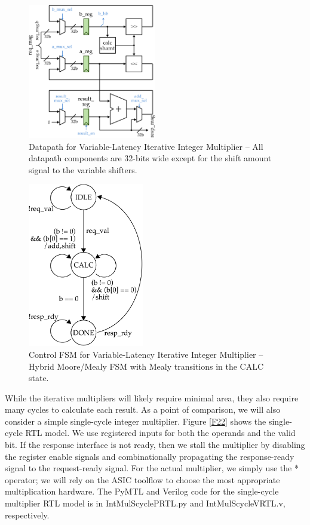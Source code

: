 \documentclass[a4paper,12pt,twoside]{article}
\begin{document}
\begin{figure}[H]
    \centering
    \includegraphics[width=0.5\textwidth]{images/20.png}
    \caption{Datapath for Variable-Latency Iterative Integer Multiplier – All datapath components are 32-bits wide except for the shift amount signal to the variable shifters.}
    \label{F20}
\end{figure}
\begin{figure}[H]
    \centering
    \includegraphics[width=0.45\textwidth]{images/21.png}
    \caption{Control FSM for Variable-Latency Iterative Integer Multiplier – Hybrid Moore/Mealy FSM with Mealy transitions in the CALC state.}
    \label{F21}
\end{figure}
While the iterative multipliers will likely require minimal area, they also require many cycles to calculate each result. As a point of comparison, we will also consider a simple single-cycle integer multiplier. Figure \ref{F22} shows the single-cycle RTL model. We use registered inputs for both the operands and the valid bit. If the response interface is not ready, then we stall the multiplier by disabling the register enable signals and combinationally propagating the response-ready signal to the request-ready signal. For the actual multiplier, we simply use the * operator; we will rely on the ASIC toolflow to choose the most appropriate multiplication hardware. The PyMTL and Verilog code for the single-cycle multiplier RTL model is in IntMulScyclePRTL.py and IntMulScycleVRTL.v, respectively.
\end{document}
